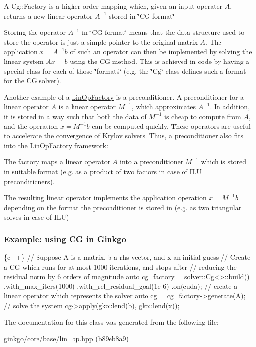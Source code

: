 \begin{DoxyItemize}
\item A Cg\+::\+Factory is a higher order mapping which, given an input operator $A$, returns a new linear operator $A^{-1}$ stored in \char`\"{}\+C\+G
    format\char`\"{}
\item Storing the operator $A^{-1}$ in \char`\"{}\+C\+G format\char`\"{} means that the data structure used to store the operator is just a simple pointer to the original matrix $A$. The application $x = A^{-1}b$ of such an operator can then be implemented by solving the linear system $Ax = b$ using the CG method. This is achieved in code by having a special class for each of those \char`\"{}formats\char`\"{} (e.\+g. the \char`\"{}\+Cg\char`\"{} class defines such a format for the CG solver).
\end{DoxyItemize}

Another example of a \hyperlink{classgko_1_1LinOpFactory}{Lin\+Op\+Factory} is a preconditioner. A preconditioner for a linear operator $A$ is a linear operator $M^{-1}$, which approximates $A^{-1}$. In addition, it is stored in a way such that both the data of $M^{-1}$ is cheap to compute from $A$, and the operation $x = M^{-1}b$ can be computed quickly. These operators are useful to accelerate the convergence of Krylov solvers. Thus, a preconditioner also fits into the \hyperlink{classgko_1_1LinOpFactory}{Lin\+Op\+Factory} framework\+:


\begin{DoxyItemize}
\item The factory maps a linear operator $A$ into a preconditioner $M^{-1}$ which is stored in suitable format (e.\+g. as a product of two factors in case of I\+LU preconditioners).
\item The resulting linear operator implements the application operation $x = M^{-1}b$ depending on the format the preconditioner is stored in (e.\+g. as two triangular solves in case of I\+LU)
\end{DoxyItemize}

\subsubsection*{Example\+: using CG in Ginkgo }


\begin{DoxyCode}
\{c++\}
\textcolor{comment}{// Suppose A is a matrix, b a rhs vector, and x an initial guess}
\textcolor{comment}{// Create a CG which runs for at most 1000 iterations, and stops after}
\textcolor{comment}{// reducing the residual norm by 6 orders of magnitude}
\textcolor{keyword}{auto} cg\_factory = solver::Cg<>::build()
    .with\_max\_iters(1000)
    .with\_rel\_residual\_goal(1e-6)
    .on(cuda);
\textcolor{comment}{// create a linear operator which represents the solver}
\textcolor{keyword}{auto} cg = cg\_factory->generate(A);
\textcolor{comment}{// solve the system}
cg->apply(\hyperlink{namespacegko_aa8cb4876b72e5e1036ea9575443c439b}{gko::lend}(b), \hyperlink{namespacegko_aa8cb4876b72e5e1036ea9575443c439b}{gko::lend}(x));
\end{DoxyCode}
 

The documentation for this class was generated from the following file\+:\begin{DoxyCompactItemize}
\item 
ginkgo/core/base/lin\+\_\+op.\+hpp (b89eb8a9)\end{DoxyCompactItemize}
